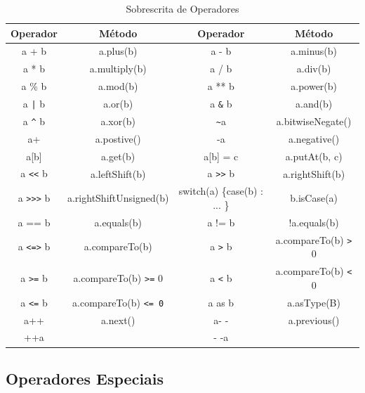 \documentclass[12pt]{article}
\begin{document}
    \begin{table}[h]
        \centering
        \caption{Sobrescrita de Operadores}
        \label{tab:OperatorDefinition}
        \begin{tabular}{| c | c | c | c |}
        \hline
        {\bf Operador} & {\bf Método} & {\bf Operador} & {\bf Método} \\
        \hline
             a + b &  a.plus(b) & a - b & a.minus(b) \\
        \hline
             a * b & a.multiply(b) & a / b &   a.div(b) \\
        \hline
            a \% b &   a.mod(b) &  a ** b & a.power(b) \\
        \hline
            a \texttt{|} b & a.or(b) & a \texttt{\&} b & a.and(b) \\
        \hline
            a \texttt{\^} b & a.xor(b) & \texttt{\~}a & a.bitwiseNegate() \\
        \hline
            a+ & a.postive() & -a & a.negative() \\
        \hline
            a[b] & a.get(b) & a[b] = c & a.putAt(b, c) \\
        \hline
            a \texttt{<<} b & a.leftShift(b) & a \texttt{>>} b & a.rightShift(b)\\ 
        \hline
            a \texttt{>>>} b & a.rightShiftUnsigned(b) & switch(a) \{case(b) : ... \} & b.isCase(a) \\
        \hline
            a == b & a.equals(b) & a != b & !a.equals(b) \\
        \hline
           a \texttt{<=>} b & a.compareTo(b) & a \texttt{>} b & a.compareTo(b) \texttt{>} 0 \\
        \hline
            a \texttt{>=} b & a.compareTo(b) \texttt{>=} 0 & a \texttt{<} b & a.compareTo(b) \texttt{<} 0 \\
        \hline
            a \texttt{<=} b & a.compareTo(b) \texttt{<= 0} & a as b & a.asType(B) \\
        \hline
            a++ & \multicolumn{ 1}{|c|}{a.next()} & a- - & \multicolumn{ 1}{|c|}{a.previous()} \\
            ++a & \multicolumn{ 1}{|c|}{} & - -a & \multicolumn{ 1}{|c|}{} \\
        \hline
        \end{tabular}  
    \end{table}

\subsection{Operadores Especiais}
\end{document}
